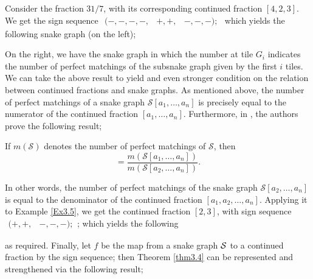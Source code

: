 \begin{example}\label{Ex3.5}
Consider the fraction $31/7$, with its corresponding continued fraction $[4,2,3]$. We get the sign sequence
$
\begin{array}{ccc}
  ( -,-,-,-,&  +,+,&  -,-,-);
\end{array}
$
which yields the following snake graph (on the left);
\begin{figure}[H]
    \centering
    
\end{figure}
\end{example}
On the right, we have the snake graph in which the number at tile $G_i$ indicates the number of perfect matchings of the subsnake graph given by the first $i$ tiles.  
We can take the above result to yield and even stronger condition on the relation between continued fractions and snake graphs. As mentioned above, the number of perfect matchings of a snake graph $\mathcal{S}[a_1,\dots,a_n]$ is precisely equal to the numerator of the continued fraction $[a_1,\dots, a_n]$. Furthermore, in \cite{CS2}, the authors prove the following result;
\begin{theorem}\label{thm3.6}
    If $m(\mathcal{S})$ denotes the number of perfect matchings of $\mathcal{S}$, then
    \begin{equation*}
        [a_1,\dots,a_n] = \dfrac{m(\mathcal{S}[a_1,\dots,a_n])}{m(\mathcal{S}[a_2,\dots,a_n])}.
    \end{equation*}
\end{theorem}
In other words, the number of perfect matchings of the snake graph $\mathcal{S}[a_2,\dots,a_n]$ is equal to the denominator of the continued fraction $[a_1,a_2,\dots,a_n]$. Applying it to Example \ref{Ex3.5}, we get the continued fraction $[2,3]$, with sign sequence $
\begin{array}{cc}
  (+,+,&  -,-,-);
\end{array}
$; which yields the following
\begin{figure}[H]
    \centering
    
\end{figure}
as required. 
Finally, let $f$ be the map from a snake graph $\mathcal{S}$ to a continued fraction by the sign sequence; then Theorem \ref{thm3.4} can be represented and strengthened via the following result; 
